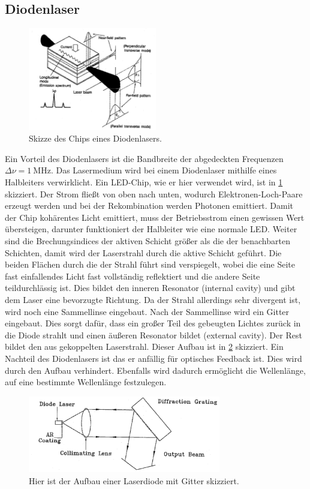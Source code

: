 \subsection{Diodenlaser}
\begin{figure}[h!]
	\centering
	\includegraphics[width = 0.5\textwidth]{../Grafiken/Schematische_Ansicht_Laserdiode.pdf}
	\caption{Skizze des Chips eines Diodenlasers.\cite{V60}\label{fig:Halleiter-Chip}}
\end{figure}
Ein Vorteil des Diodenlasers ist die Bandbreite der abgedeckten Frequenzen $\Delta \nu = \SI{1}{\mega\hertz}$.
Das Lasermedium wird bei einem Diodenlaser mithilfe eines Halbleiters verwirklicht.
Ein LED-Chip, wie er hier verwendet wird, ist in \cref{fig:Halleiter-Chip} skizziert.
Der Strom fließt von oben nach unten, wodurch Elektronen-Loch-Paare erzeugt werden und bei der Rekombination werden Photonen emittiert.
Damit der Chip kohärentes Licht emittiert, muss der Betriebsstrom einen gewissen Wert übersteigen, darunter funktioniert der Halbleiter wie eine normale LED.
Weiter sind die Brechungsindices der aktiven Schicht größer als die der benachbarten Schichten, damit wird der Laserstrahl durch die aktive Schicht geführt.
Die beiden Flächen durch die der Strahl führt sind verspiegelt, wobei die eine Seite fast einfallendes Licht fast vollständig reflektiert und die andere Seite teildurchlässig ist.
Dies bildet den inneren Resonator (internal cavity) und gibt dem Laser eine bevorzugte Richtung.
Da der Strahl allerdings sehr divergent ist, wird noch eine Sammellinse eingebaut.
Nach der Sammellinse wird ein Gitter eingebaut.
Dies sorgt dafür, dass ein großer Teil des gebeugten Lichtes zurück in die Diode strahlt und einen äußeren Resonator bildet (external cavity).
Der Rest bildet den aus gekoppelten Laserstrahl.
Dieser Aufbau ist in \cref{fig:Aufbau_Gitter_Laserdiode} skizziert.
Ein Nachteil des Diodenlasers ist das er anfällig für optisches Feedback ist.
Dies wird durch den Aufbau verhindert.
Ebenfalls wird dadurch ermöglicht die Wellenlänge, auf eine bestimmte Wellenlänge festzulegen.
\begin{figure}
	\centering
	\includegraphics[width = 0.75\textwidth]{../Grafiken/Aufbau_Gitter_Laserdiode.pdf}
	\caption{Hier ist der Aufbau einer Laserdiode mit Gitter skizziert.\cite{V60}\label{fig:Aufbau_Gitter_Laserdiode}}
\end{figure}
\newpage
